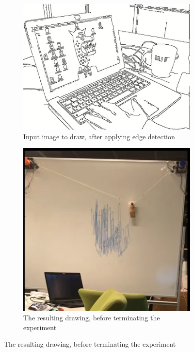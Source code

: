 \begin{figure}[H]
    \caption{Testing drawing of photographs}
    \begin{subfigure}[t]{.24\textwidth}
    \includegraphics[width=\textwidth]{Images/test_drawing.png}
    \caption{Input image to draw, after applying edge detection}
    \label{fig:test_drawing}
    \end{subfigure}
    \begin{subfigure}[t]{.24\textwidth}
    \includegraphics[width=\textwidth]{Images/DrawingMachine/DrawingComputer}
    \caption{The resulting drawing, before terminating the experiment}
    \label{fig:attempted_drawing}
    \end{subfigure}
\end{figure}